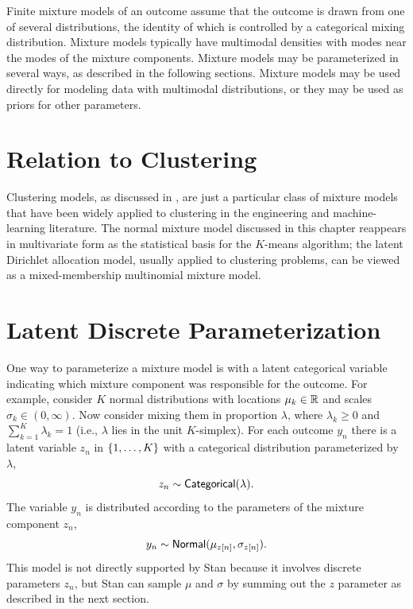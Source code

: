 \noindent
Finite mixture models of an outcome assume that the outcome is drawn
from one of several distributions, the identity of which is controlled
by a categorical mixing distribution.  Mixture models typically have
multimodal densities with modes near the modes of the mixture
components.  Mixture models may be parameterized in several ways, as
described in the following sections.  Mixture models may be used
directly for modeling data with multimodal distributions, or they may
be used as priors for other parameters.

\section{Relation to Clustering}\label{clustering-mixture.section}

Clustering models, as discussed in , are just a
particular class of mixture models that have been widely applied to
clustering in the engineering and machine-learning literature.  The
normal mixture model discussed in this chapter reappears in
multivariate form as the statistical basis for the $K$-means
algorithm;  the latent Dirichlet allocation model, usually applied to
clustering problems, can be viewed as a mixed-membership multinomial
mixture model. 


\section{Latent Discrete Parameterization}

One way to parameterize a mixture model is with a latent categorical
variable indicating which mixture component was responsible for the
outcome. For example, consider $K$ normal distributions with locations
$\mu_k \in \reals$ and scales $\sigma_k \in (0,\infty)$.  Now consider
mixing them in proportion $\lambda$, where $\lambda_k \geq 0$ and
$\sum_{k=1}^K \lambda_k = 1$ (i.e., $\lambda$ lies in the unit $K$-simplex).
For each outcome $y_n$ there is a latent variable $z_n$ in
$\setlist{1,\ldots,K}$ with a categorical distribution parameterized
by $\lambda$,
%
\[
z_n \sim \distro{Categorical}(\lambda).
\]
%
The variable $y_n$ is distributed according to the parameters
of the mixture component $z_n$, 
\[
y_n \sim \distro{Normal}(\mu_{z[n]},\sigma_{z[n]}).
\]
%
This model is not directly supported by Stan because it involves
discrete parameters $z_n$, but Stan can sample $\mu$ and $\sigma$ 
by summing out the $z$ parameter as described in the next section.


